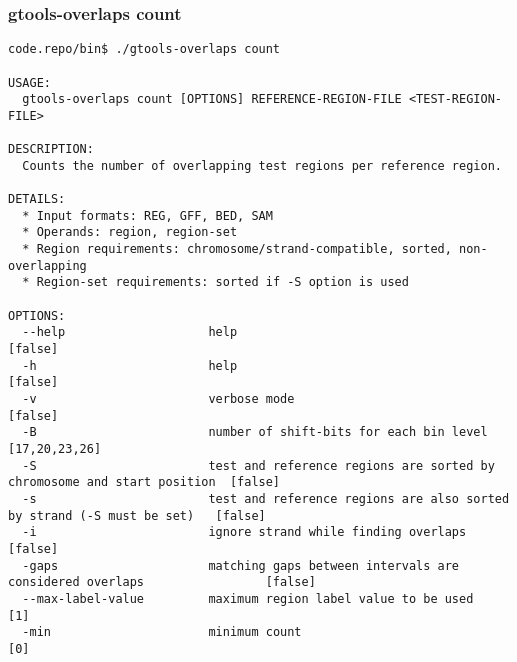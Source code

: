 \subsubsection{gtools-overlaps count}\label{gtools-overlaps_count}
\begin{lstlisting}
code.repo/bin$ ./gtools-overlaps count

USAGE:
  gtools-overlaps count [OPTIONS] REFERENCE-REGION-FILE <TEST-REGION-FILE>

DESCRIPTION:
  Counts the number of overlapping test regions per reference region.

DETAILS:
  * Input formats: REG, GFF, BED, SAM
  * Operands: region, region-set
  * Region requirements: chromosome/strand-compatible, sorted, non-overlapping
  * Region-set requirements: sorted if -S option is used

OPTIONS:
  --help                    help                                                                    [false]
  -h                        help                                                                    [false]
  -v                        verbose mode                                                            [false]
  -B                        number of shift-bits for each bin level                                 [17,20,23,26]
  -S                        test and reference regions are sorted by chromosome and start position  [false]
  -s                        test and reference regions are also sorted by strand (-S must be set)   [false]
  -i                        ignore strand while finding overlaps                                    [false]
  -gaps                     matching gaps between intervals are considered overlaps                 [false]
  --max-label-value         maximum region label value to be used                                   [1]
  -min                      minimum count                                                           [0]
\end{lstlisting}
%
